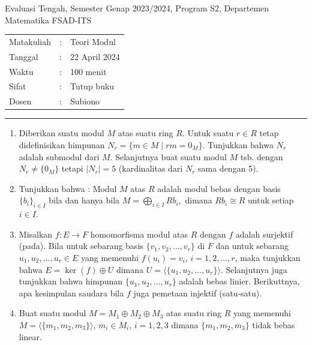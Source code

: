 \documentclass[11pt,a4paper]{article}
\begin{document}
\begin{center}
  Evaluasi Tengah, Semester Genap 2023/2024, Program S2, Departemen Matematika FSAD-ITS
\end{center}
\begin{center}
  \begin{tabular}{p{2.5cm} c l}
    Matakuliah & : & Teori Modul   \\
    Tanggal    & : & 22 April 2024 \\
    Waktu      & : & 100 menit     \\
    Sifat      & : & Tutup buku    \\
    Dosen      & : & Subiono       \\
  \end{tabular}

  \vspace{0.25cm}

  \rule{0.5\textwidth}{0.4pt}
\end{center}
\vspace{0.25cm}

\begin{enumerate}
  \item Diberikan suatu modul $M$ atas suatu ring $R$. Untuk suatu $r \in R$ tetap didefinisikan himpunan
        $
          N_r = \{m \in M \mid rm = 0_M\}.
        $
        Tunjukkan bahwa $N_r$ adalah submodul dari $M$. Selanjutnya buat suatu modul $M$ tsb. dengan $N_r \neq \{0_M\}$ tetapi $|N_r| = 5$ (kardinalitas dari $N_r$ sama dengan 5).

  \item Tunjukkan bahwa : Modul $M$ atas $R$ adalah modul bebas dengan basis $\{b_i\}_{i\in I}$ bila dan hanya bila
        $
          M = \bigoplus_{i\in I} Rb_i,
        $
        dimana $Rb_i \cong R$ untuk setiap $i \in I$.

  \item Misalkan $f : E \to F$ homomorfisma modul atas $R$ dengan $f$ adalah surjektif (pada). Bila untuk sebarang basis $\{v_1,v_2,\dots,v_r\}$ di $F$ dan untuk sebarang $u_1,u_2,\dots,u_r \in E$ yang memenuhi $f(u_i)=v_i$, $i=1,2,\dots,r$, maka tunjukkan bahwa
        $
          E = \ker(f) \oplus U
        $
        dimana $U = \langle \{u_1,u_2,\dots,u_r\}\rangle$. Selanjutnya juga tunjukkan bahwa himpunan $\{u_1,u_2,\dots,u_r\}$ adalah bebas linier. Berikuttnya, apa kesimpulan saudara bila $f$ juga pemetaan injektif (satu-satu).


  \item Buat suatu modul $M = M_1 \oplus M_2 \oplus M_3$ atas suatu ring $R$ yang memenuhi $M = \langle \{m_1,m_2,m_3\} \rangle$, $m_i \in M_i$, $i=1,2,3$ dimana $\{m_1,m_2,m_3\}$ tidak bebas linear.

\end{enumerate}
\end{document}
